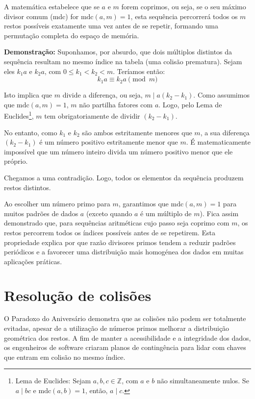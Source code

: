 \documentclass[12pt, a4paper]{article}
\begin{document}
A matemática estabelece que se $a$ e $m$ forem coprimos, ou seja, se o seu máximo divisor comum (mdc) for $\text{mdc}(a, m) = 1$, 
esta sequência percorrerá todos os $m$ restos possíveis exatamente uma vez antes de se repetir, formando uma permutação completa 
do espaço de memória.

\textbf{Demonstração:} Suponhamos, por absurdo, que dois múltiplos distintos da sequência resultam no 
mesmo índice na tabela (uma colisão prematura). Sejam eles $k_1 a$ e $k_2 a$, com $0 \leq k_1 < k_2 < m$. 
Teríamos então:
\begin{equation}
    k_1 a \equiv k_2 a \pmod{m}
\end{equation}

Isto implica que $m$ divide a diferença, ou seja, $m \mid a(k_2 - k_1)$. Como assumimos que $\text{mdc}(a, m) = 1$, $m$ 
não partilha fatores com $a$. Logo, pelo Lema de Euclides\footnote{Lema de Euclides: Sejam $a, b, c \in \mathbb{Z}$, 
com $a$ e $b$ não simultaneamente nulos. Se $a \mid bc$ e $\text{mdc}(a, b) = 1$, então, $a \mid c$.}, $m$ tem obrigatoriamente 
de dividir $(k_2 - k_1)$. 

No entanto, como $k_1$ e $k_2$ são ambos estritamente menores que $m$, a sua diferença $(k_2 - k_1)$ 
é um número positivo estritamente menor que $m$. É matematicamente impossível que um número inteiro 
divida um número positivo menor que ele próprio. 

Chegamos a uma contradição. Logo, todos os elementos da sequência produzem restos distintos. 

Ao escolher um número primo para $m$, garantimos que $\text{mdc}(a, m) = 1$ para muitos
padrões de dados $a$ (exceto quando $a$ é um múltiplo de $m$). 
Fica assim demonstrado que, para sequências aritméticas cujo passo seja coprimo com $m$, os restos percorrem
todos os índices possíveis antes de se repetirem. Esta propriedade explica por que razão divisores primos
tendem a reduzir padrões periódicos e a favorecer uma distribuição mais homogénea dos dados em muitas aplicações práticas.

\section{Resolução de colisões}
O Paradoxo do Aniversário demonstra que as colisões não podem ser totalmente evitadas, 
apesar de a utilização de números primos melhorar a distribuição geométrica dos restos. 
A fim de manter a acessibilidade e a integridade dos dados, os engenheiros de software 
criaram planos de contingência para lidar com chaves que entram em colisão no mesmo índice.
\end{document}
